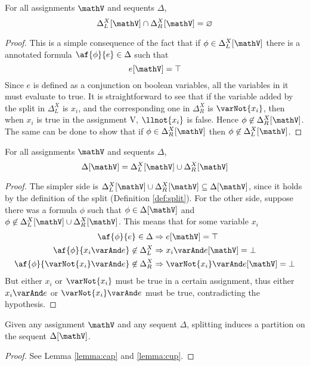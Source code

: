 \begin{lemma}
	\label{lemma:cap}
	For all assignments $\mathV$ and sequents $\Delta$,
	$$ \Delta_L^X[\mathV] \cap \Delta_R^X[\mathV] = \varnothing $$
\end{lemma}
\begin{proof}
	This is a simple consequence of the fact that if $\phi \in \Delta_L^X[\mathV]$ there is a annotated formula $\af{\phi}{e} \in \Delta$ such that 
	$$ e[\mathV] = \top $$
	Since $e$ is defined as a conjunction on boolean variables, all the variables in it must evaluate to true.
	It is straightforward to see that if the variable added by the split in $\Delta_L^X$ is $x_i$, and the corresponding one in $\Delta_R^X$ is $\varNot{x_i}$, then when $x_i$ is true in the assignment V, $\llnot{x_i}$ is false.
	Hence $\phi \not \in \Delta_R^X[\mathV]$.
	The same can be done to show that if $\phi \in \Delta_R^X[\mathV]$ then $\phi \not \in \Delta_L^X[\mathV]$.
\end{proof}
\begin{lemma}
	\label{lemma:cup}
	For all assignments $\mathV$ and sequents $\Delta$,
	$$ \Delta[\mathV] = \Delta_L^X[\mathV] \cup \Delta_R^X[\mathV] $$
\end{lemma}
\begin{proof}
	The simpler side is $\Delta_L^X[\mathV] \cup \Delta_R^X[\mathV] \subseteq \Delta[\mathV]$, since it  holds by the definition of the split (Definition \ref{def:split}).
	For the other side, suppose there was a formula $\phi$ such that $\phi \in \Delta[\mathV]$ and $\phi \not \in \Delta_L^X[\mathV] \cup \Delta_R^X[\mathV]$.
	This means that for some variable $x_i$ 
	\begin{align*}
		\af{\phi}{e} \in \Delta &\Rightarrow e[\mathV] = \top \\
		\af{\phi}{x_i \varAnd e} \not \in \Delta_L^X &\Rightarrow x_i \varAnd e[\mathV] = \bot \\
		\af{\phi}{\varNot{x_i} \varAnd e} \not \in \Delta_R^X &\Rightarrow \varNot{x_i} \varAnd e[\mathV] = \bot
	\end{align*}
	But either $x_i$ or $\varNot{x_i}$ must be true in a certain assignment, thus either $x_i \varAnd e$ or $\varNot{x_i} \varAnd e$ must be true, contradicting the hypothesis.
\end{proof}
\begin{lemma}
	Given any assignment $\mathV$ and any sequent $\Delta$, splitting induces a partition on the sequent $\Delta[\mathV]$.
\end{lemma}
\begin{proof}
	See Lemma \ref{lemma:cap} and \ref{lemma:cup}.
\end{proof}

